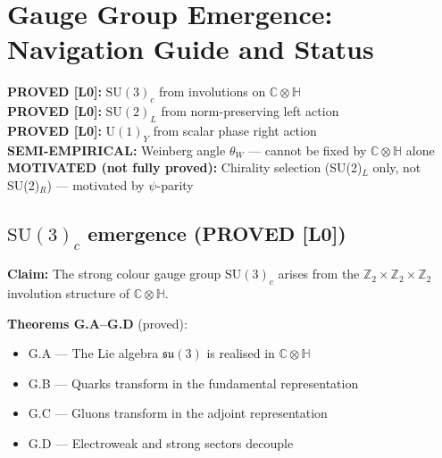 %


\section{Gauge Group Emergence: Navigation Guide and Status}
\label{sec:bridges:gauge_emergence}

\begin{tcolorbox}[colback=green!5!white,colframe=green!50!black,title=Gauge Group Status Summary]
\textbf{PROVED [L0]:} $\mathrm{SU}(3)_c$ from involutions on $\mathbb{C}\otimes\mathbb{H}$ \\
\textbf{PROVED [L0]:} $\mathrm{SU}(2)_L$ from norm-preserving left action \\
\textbf{PROVED [L0]:} $\mathrm{U}(1)_Y$ from scalar phase right action \\
\textbf{SEMI-EMPIRICAL:} Weinberg angle $\theta_W$ — cannot be fixed by $\mathbb{C}\otimes\mathbb{H}$ alone \\
\textbf{MOTIVATED (not fully proved):} Chirality selection (SU(2)$_L$ only, not SU(2)$_R$) — motivated by $\psi$-parity
\end{tcolorbox}

\subsection{\texorpdfstring{$\mathrm{SU}(3)_c$}{SU(3)c} emergence (PROVED [L0])}

\textbf{Claim:} The strong colour gauge group $\mathrm{SU}(3)_c$ arises from
the $\mathbb{Z}_2 \times \mathbb{Z}_2 \times \mathbb{Z}_2$ involution structure
of $\mathbb{C}\otimes\mathbb{H}$.

\textbf{Theorems G.A--G.D} (proved):
\begin{itemize}
  \item G.A — The Lie algebra $\mathfrak{su}(3)$ is realised in $\mathbb{C}\otimes\mathbb{H}$
  \item G.B — Quarks transform in the fundamental representation
  \item G.C — Gluons transform in the adjoint representation
  \item G.D — Electroweak and strong sectors decouple
\end{itemize}

